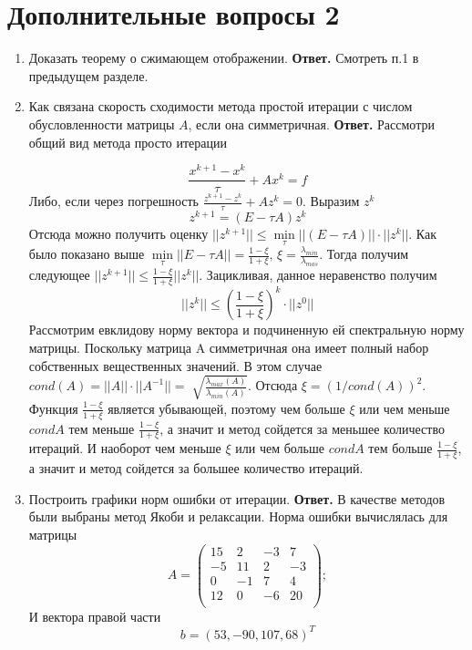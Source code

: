 \documentclass{article}
\begin{document}
    \section{Дополнительные вопросы 2}
    \begin{enumerate}
        \item Доказать теорему о сжимающем отображении.
        \newline
        {\bfseries Ответ.} Смотреть п.1 в предыдущем разделе.
        \item Как связана скорость сходимости метода простой итерации с числом обусловленности 
        матрицы $A$, если она симметричная.
        \newline
        {\bfseries Ответ.}
        Рассмотри общий вид метода просто итерации
	
        \[
        \frac{x^{k+1}-x^k}{\tau} + Ax^k = f
        \]
        Либо, если через погрешность $\frac{z^{k+1}-z^k}{\tau} + Az^k = 0$. Выразим $z^k$
        \[
        z^{k+1} = (E-\tau A)z^k
        \]
        Отсюда можно получить оценку $||z^{k+1}|| \le \min \limits_{\tau} ||(E-\tau A)|| \cdot ||z^k||$. Как было показано выше $\min \limits_{\tau} ||E-\tau A|| = \frac{1-\xi}{1+\xi}, \, \xi = \frac{\lambda_{min}}{\lambda_{mas}}$. Тогда получим следующее $||z^{k+1}|| \le \frac{1-\xi}{1+\xi} ||z^k||$. Зацикливая, данное неравенство получим
        \[
        ||z^k|| \le \left(\frac{1-\xi}{1+\xi}\right)^k \cdot ||z^0||
        \]
        Рассмотрим евклидову норму вектора и подчиненную ей спектральную норму матрицы. Поскольку матрица A симметричная она имеет полный набор собственных вещественных значений. В этом случае $cond(A)=||A|| \cdot ||A^{-1}||= \sqrt[]{\frac{\lambda_{max}(A)}{\lambda_{min}(A)}}$. Отсюда $\xi=(1/cond(A))^2$. Функция $\frac{1-\xi}{1+\xi}$ является убывающей, поэтому чем больше $\xi$ или чем меньше$condA$ тем меньше $\frac{1-\xi}{1+\xi}$, а значит и метод сойдется за меньшее количество итераций. И наоборот чем меньше $\xi$ или чем больше $condA$ тем больше $\frac{1-\xi}{1+\xi}$, а значит и метод сойдется за большее количество итераций.

        \item Построить графики норм ошибки от итерации.
        \newline
        {\bfseries Ответ.}
        В качестве методов были выбраны метод Якоби и релаксации. Норма ошибки 
        вычислялась для матрицы 
        \begin{equation*}
            A = 
            \begin{pmatrix}
                15 & 2& -3& 7 \\ 
                -5 & 11 & 2 & -3  \\ 
                0 & -1 & 7 & 4  \\ 
                12 & 0 & -6 & 20 \\
            \end{pmatrix};
        \end{equation*}
        И вектора правой части
        \begin{equation*}
            b = (53, -90, 107, 68)^T
        \end{equation*}
        

\end{enumerate}
\end{document}
